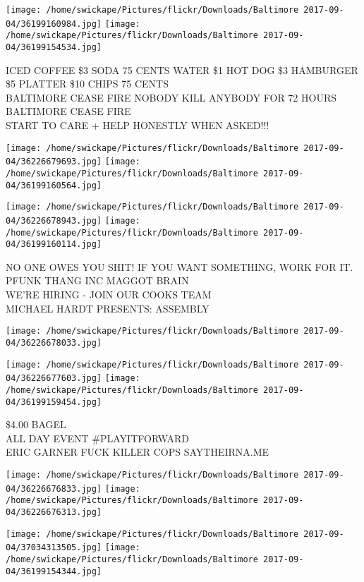 \documentclass[10pt,letterpaper]{article}
\begin{document}
\texttt{[image: /home/swickape/Pictures/flickr/Downloads/Baltimore 2017-09-04/36199160984.jpg]}
\texttt{[image: /home/swickape/Pictures/flickr/Downloads/Baltimore 2017-09-04/36199154534.jpg]}

ICED COFFEE \$3 SODA 75 CENTS WATER \$1 HOT DOG \$3 HAMBURGER \$5 PLATTER \$10 CHIPS 75 CENTS\\
BALTIMORE CEASE FIRE NOBODY KILL ANYBODY FOR 72 HOURS\\
BALTIMORE CEASE FIRE\\
START TO CARE + HELP HONESTLY WHEN ASKED!!!
\pagebreak

\texttt{[image: /home/swickape/Pictures/flickr/Downloads/Baltimore 2017-09-04/36226679693.jpg]}
\texttt{[image: /home/swickape/Pictures/flickr/Downloads/Baltimore 2017-09-04/36199160564.jpg]}

\texttt{[image: /home/swickape/Pictures/flickr/Downloads/Baltimore 2017-09-04/36226678943.jpg]}
\texttt{[image: /home/swickape/Pictures/flickr/Downloads/Baltimore 2017-09-04/36199160114.jpg]}

NO ONE OWES YOU SHIT!  IF YOU WANT SOMETHING, WORK FOR IT.\\
PFUNK THANG INC MAGGOT BRAIN\\
WE'RE HIRING {-} JOIN OUR COOKS TEAM\\
MICHAEL HARDT PRESENTS: ASSEMBLY
\pagebreak

\texttt{[image: /home/swickape/Pictures/flickr/Downloads/Baltimore 2017-09-04/36226678033.jpg]}

\vspace{0.25in}
\texttt{[image: /home/swickape/Pictures/flickr/Downloads/Baltimore 2017-09-04/36226677603.jpg]}
\texttt{[image: /home/swickape/Pictures/flickr/Downloads/Baltimore 2017-09-04/36199159454.jpg]}

\$4.00 BAGEL\\
ALL DAY EVENT \#PLAYITFORWARD\\
ERIC GARNER FUCK KILLER COPS SAYTHEIRNA.ME
\pagebreak

\texttt{[image: /home/swickape/Pictures/flickr/Downloads/Baltimore 2017-09-04/36226676833.jpg]}
\texttt{[image: /home/swickape/Pictures/flickr/Downloads/Baltimore 2017-09-04/36226676313.jpg]}

\texttt{[image: /home/swickape/Pictures/flickr/Downloads/Baltimore 2017-09-04/37034313505.jpg]}
\texttt{[image: /home/swickape/Pictures/flickr/Downloads/Baltimore 2017-09-04/36199154344.jpg]}
\end{document}
